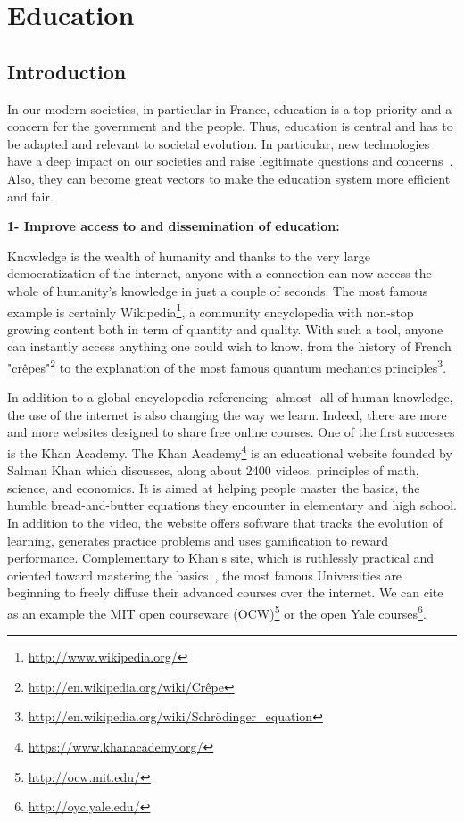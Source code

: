 
\cleartoleftpage


\chapter{Education} %
\label{cha:education}


\section{Introduction} %

In our modern societies, in particular in France, education is a top priority and a concern for the government and the people. Thus, education is central and has to be adapted and relevant to societal evolution. In particular, new technologies have a deep impact on our societies and raise legitimate questions and concerns~\parencite{plester2008txt}. Also, they can become great vectors to make the education system more efficient and fair.


\textbf{1- Improve access to  and dissemination of education:}

Knowledge is the wealth of humanity and thanks to the very large democratization of the internet, anyone with a connection can now access the whole of humanity’s knowledge in just a couple of seconds. The most famous example is certainly Wikipedia\footnote{\url{http://www.wikipedia.org/}}, a community encyclopedia with non-stop growing content both in term of quantity and quality. With such a tool, anyone can instantly access  anything one could wish to know, from the history of French "crêpes"\footnote{\url{http://en.wikipedia.org/wiki/Crêpe}} to the explanation of the most famous quantum mechanics principles\footnote{\url{http://en.wikipedia.org/wiki/Schrödinger_equation}}.

In addition to a global encyclopedia referencing -almost- all of human knowledge, the use of the internet is also changing the way we learn. Indeed, there are more and more websites designed to share free online courses. One of the first successes is the Khan Academy.
The Khan Academy\footnote{\url{https://www.khanacademy.org/}} is an educational website founded by Salman Khan which discusses, along about 2400 videos, principles of math, science, and economics.  It is aimed at helping people master the basics, the humble bread-and-butter equations they encounter in elementary and high school. In addition to the video, the website offers software that tracks the evolution of learning, generates practice problems and uses gamification to reward performance.
Complementary to Khan's site, which is ruthlessly practical and oriented toward mastering the basics~\parencite{thompson2011khan}, the most famous Universities are beginning to freely diffuse their advanced courses over the internet. We can cite as an example the MIT open courseware (OCW)\footnote{\url{http://ocw.mit.edu/}} or the open Yale courses\footnote{\url{http://oyc.yale.edu/}}.

